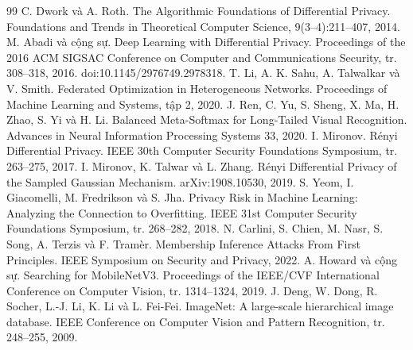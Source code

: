 \documentclass[12pt,a4paper]{report}
\begin{document}
\begin{thebibliography}{99}
 C. Dwork và A. Roth. \newblock The Algorithmic Foundations of Differential Privacy. \newblock Foundations and Trends in Theoretical Computer Science, 9(3--4):211--407, 2014.
 M. Abadi và cộng sự. \newblock Deep Learning with Differential Privacy. \newblock Proceedings of the 2016 ACM SIGSAC Conference on Computer and Communications Security, tr. 308--318, 2016. \newblock doi:10.1145/2976749.2978318.
 T. Li, A. K. Sahu, A. Talwalkar và V. Smith. \newblock Federated Optimization in Heterogeneous Networks. \newblock Proceedings of Machine Learning and Systems, tập 2, 2020.
 J. Ren, C. Yu, S. Sheng, X. Ma, H. Zhao, S. Yi và H. Li. \newblock Balanced Meta-Softmax for Long-Tailed Visual Recognition. \newblock Advances in Neural Information Processing Systems 33, 2020.
 I. Mironov. \newblock Rényi Differential Privacy. \newblock IEEE 30th Computer Security Foundations Symposium, tr. 263--275, 2017.
 I. Mironov, K. Talwar và L. Zhang. \newblock Rényi Differential Privacy of the Sampled Gaussian Mechanism. \newblock arXiv:1908.10530, 2019.
 S. Yeom, I. Giacomelli, M. Fredrikson và S. Jha. \newblock Privacy Risk in Machine Learning: Analyzing the Connection to Overfitting. \newblock IEEE 31st Computer Security Foundations Symposium, tr. 268--282, 2018.
 N. Carlini, S. Chien, M. Nasr, S. Song, A. Terzis và F. Tramèr. \newblock Membership Inference Attacks From First Principles. \newblock IEEE Symposium on Security and Privacy, 2022.
 A. Howard và cộng sự. \newblock Searching for MobileNetV3. \newblock Proceedings of the IEEE/CVF International Conference on Computer Vision, tr. 1314--1324, 2019.
 J. Deng, W. Dong, R. Socher, L.-J. Li, K. Li và L. Fei-Fei. \newblock ImageNet: A large-scale hierarchical image database. \newblock IEEE Conference on Computer Vision and Pattern Recognition, tr. 248--255, 2009.
\end{thebibliography}
\end{document}
